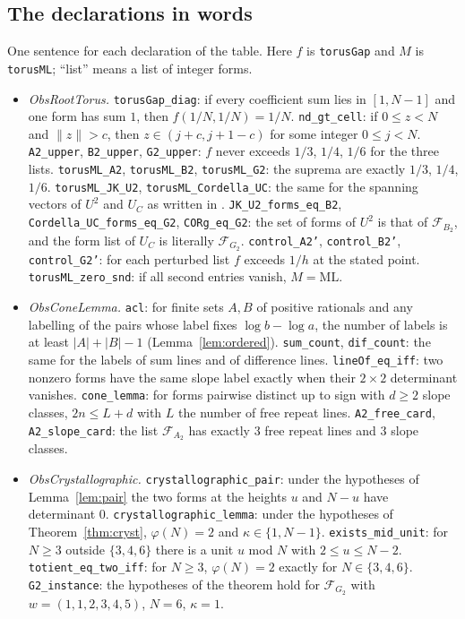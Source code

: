 \documentclass[11pt]{amsart}
\theoremstyle{definition}
\theoremstyle{remark}
\newcommand{\dist}[1]{\lVert #1\rVert}
\newcommand{\ML}{\mathrm{ML}}
\newcommand{\lean}[1]{\texttt{#1}}
\begin{document}
\subsection*{The declarations in words}
One sentence for each declaration of the table. Here $f$ is \lean{torusGap} and $M$ is \lean{torusML}; ``list'' means a list of integer forms.
{\small
\begin{itemize}[leftmargin=1.5em,itemsep=0pt]
\item \emph{ObsRootTorus.} \lean{torusGap\_diag}: if every coefficient sum lies in $[1,N-1]$ and one form has sum $1$, then $f(1/N,1/N)=1/N$. \lean{nd\_gt\_cell}: if $0\le z<N$ and $\dist z>c$, then $z\in(j+c,j+1-c)$ for some integer $0\le j<N$. \lean{A2\_upper}, \lean{B2\_upper}, \lean{G2\_upper}: $f$ never exceeds $1/3$, $1/4$, $1/6$ for the three lists. \lean{torusML\_A2}, \lean{torusML\_B2}, \lean{torusML\_G2}: the suprema are exactly $1/3$, $1/4$, $1/6$. \lean{torusML\_JK\_U2}, \lean{torusML\_Cordella\_UC}: the same for the spanning vectors of $U^2$ and $U_C$ as written in \cite{JK,Cordella}. \lean{JK\_U2\_forms\_eq\_B2}, \lean{Cordella\_UC\_forms\_eq\_G2}, \lean{CORg\_eq\_G2}: the set of forms of $U^2$ is that of $\mathcal F_{B_2}$, and the form list of $U_C$ is literally $\mathcal F_{G_2}$. \lean{control\_A2'}, \lean{control\_B2'}, \lean{control\_G2'}: for each perturbed list $f$ exceeds $1/h$ at the stated point. \lean{torusML\_zero\_snd}: if all second entries vanish, $M=\ML$.
\item \emph{ObsConeLemma.} \lean{acl}: for finite sets $A,B$ of positive rationals and any labelling of the pairs whose label fixes $\log b-\log a$, the number of labels is at least $|A|+|B|-1$ (Lemma~\ref{lem:ordered}). \lean{sum\_count}, \lean{dif\_count}: the same for the labels of sum lines and of difference lines. \lean{lineOf\_eq\_iff}: two nonzero forms have the same slope label exactly when their $2\times2$ determinant vanishes. \lean{cone\_lemma}: for forms pairwise distinct up to sign with $d\ge2$ slope classes, $2n\le L+d$ with $L$ the number of free repeat lines. \lean{A2\_free\_card}, \lean{A2\_slope\_card}: the list $\mathcal F_{A_2}$ has exactly $3$ free repeat lines and $3$ slope classes.
\item \emph{ObsCrystallographic.} \lean{crystallographic\_pair}: under the hypotheses of Lemma~\ref{lem:pair} the two forms at the heights $u$ and $N-u$ have determinant $0$. \lean{crystallographic\_lemma}: under the hypotheses of Theorem~\ref{thm:cryst}, $\varphi(N)=2$ and $\kappa\in\{1,N-1\}$. \lean{exists\_mid\_unit}: for $N\ge3$ outside $\{3,4,6\}$ there is a unit $u$ mod $N$ with $2\le u\le N-2$. \lean{totient\_eq\_two\_iff}: for $N\ge3$, $\varphi(N)=2$ exactly for $N\in\{3,4,6\}$. \lean{G2\_instance}: the hypotheses of the theorem hold for $\mathcal F_{G_2}$ with $w=(1,1,2,3,4,5)$, $N=6$, $\kappa=1$.

\end{itemize}}
\end{document}
